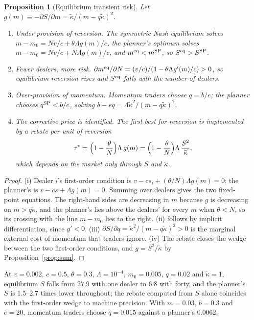 \documentclass[12pt]{article}
\newtheorem{proposition}[theorem]{Proposition}
\theoremstyle{definition}
\theoremstyle{remark}
\begin{document}
\begin{proposition}[Equilibrium transient risk]\label{prop:equil}
Let $g(m)\equiv-\partial S/\partial m=\tilde\kappa/(m-q\tilde\kappa)^2$.
\begin{enumerate}[label=(\roman*)]
\item \emph{Under-provision of reversion.} The symmetric Nash equilibrium solves $m-m_0=N v/c+\theta\Lambda g(m)/c$, the planner's optimum solves $m-m_0=N v/c+N\Lambda g(m)/c$, and $m^{\rm eq}<m^{\rm SP}$, so $S^{\rm eq}>S^{\rm SP}$.
\item \emph{Fewer dealers, more risk.} $\partial m^{\rm eq}/\partial N=(v/c)/(1-\theta\Lambda g'(m)/c)>0$, so equilibrium reversion rises and $S^{\rm eq}$ falls with the number of dealers.
\item \emph{Over-provision of momentum.} Momentum traders choose $q=b/e$; the planner chooses $q^{\rm SP}<b/e$, solving $b-eq=\Lambda\tilde\kappa^2/(m-q\tilde\kappa)^2$.
\item \emph{The corrective price is identified.} The first best for reversion is implemented by a rebate per unit of reversion
\[
\tau^*=\Bigl(1-\frac\theta N\Bigr)\Lambda\,g(m)=\Bigl(1-\frac\theta N\Bigr)\Lambda\,\frac{S^2}{\tilde\kappa},
\]
which depends on the market only through $S$ and $\tilde\kappa$.
\end{enumerate}
\end{proposition}

\begin{proof}
(i) Dealer $i$'s first-order condition is $v-cs_i+(\theta/N)\Lambda g(m)=0$; the planner's is $v-cs+\Lambda g(m)=0$. Summing over dealers gives the two fixed-point equations. The right-hand sides are decreasing in $m$ because $g$ is decreasing on $m>q\tilde\kappa$, and the planner's lies above the dealers' for every $m$ when $\theta<N$, so its crossing with the line $m-m_0$ lies to the right. (ii) follows by implicit differentiation, since $g'<0$. (iii) $\partial S/\partial q=\tilde\kappa^2/(m-q\tilde\kappa)^2>0$ is the marginal external cost of momentum that traders ignore. (iv) The rebate closes the wedge between the two first-order conditions, and $g=S^2/\tilde\kappa$ by Proposition~\ref{prop:sum}.
\end{proof}

At $v=0.002$, $c=0.5$, $\theta=0.3$, $\Lambda=10^{-4}$, $m_0=0.005$, $q=0.02$ and $\tilde\kappa=1$, equilibrium $S$ falls from 27.9 with one dealer to 6.8 with forty, and the planner's $S$ is 1.5--2.7 times lower throughout; the rebate computed from $S$ alone coincides with the first-order wedge to machine precision. With $m=0.03$, $b=0.3$ and $e=20$, momentum traders choose $q=0.015$ against a planner's $0.0062$.
\end{document}
